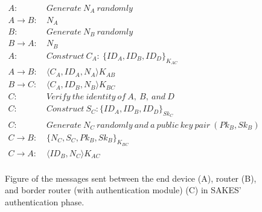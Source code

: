 


\begin{figure}[h]
\begin{tcolorbox}[title=Authentication in SAKES]
\begin{align*}
A:\ & Generate\ N_A\ randomly\\
A \rightarrow B:\ & N_A\\
B:\ & Generate\ N_B\ randomly\\
B \rightarrow A:\ & N_B\\
A:\ & Construct\ C_{A}:\ \{ID_A, ID_B, ID_D\}_{K_{AC}}\\
A \rightarrow B:\ & \langle{C_A, ID_A, N_A}\rangle{K_{AB}}\\
B \rightarrow C:\ & \langle{C_A, ID_B, N_B}\rangle{K_{BC}}\\
C:\ & Verify\ the\ identity\ of\ A,\ B,\ and\ D\\
C: \ & Construct\ S_C: \{ID_A, ID_B, ID_D\}_{Sk_{C}}\\
C:\ & Generate\ N_C\ randomly\ and\ a\ public\ key\ pair\ (Pk_B, Sk_B)\\
C \rightarrow B:\ & \{N_C, S_C, Pk_B, Sk_B\}_{K_{BC}}\\
C \rightarrow A:\ & \langle{ID_B, N_C}\rangle{K_{AC}}\\
\end{align*}
\end{tcolorbox}
\caption{Figure of the messages sent between the end device (A), router (B), and border router (with authentication module) (C) in SAKES' authentication phase.}
\label{fig:sakes-auth}
\end{figure}

